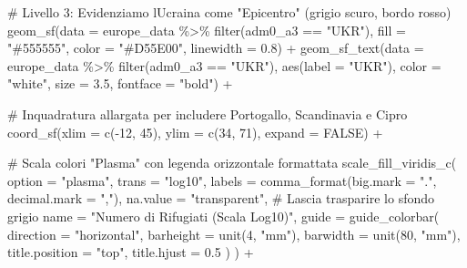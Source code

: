 \documentclass[
  letterpaper,
  DIV=11,
  numbers=noendperiod]{scrartcl}
\newenvironment{Shaded}{\begin{snugshade}}{\end{snugshade}}
\newcommand{\AttributeTok}[1]{\textcolor[rgb]{0.40,0.45,0.13}{#1}}
\newcommand{\CommentTok}[1]{\textcolor[rgb]{0.37,0.37,0.37}{#1}}
\newcommand{\ConstantTok}[1]{\textcolor[rgb]{0.56,0.35,0.01}{#1}}
\newcommand{\DecValTok}[1]{\textcolor[rgb]{0.68,0.00,0.00}{#1}}
\newcommand{\FloatTok}[1]{\textcolor[rgb]{0.68,0.00,0.00}{#1}}
\newcommand{\FunctionTok}[1]{\textcolor[rgb]{0.28,0.35,0.67}{#1}}
\newcommand{\NormalTok}[1]{\textcolor[rgb]{0.00,0.23,0.31}{#1}}
\newcommand{\SpecialCharTok}[1]{\textcolor[rgb]{0.37,0.37,0.37}{#1}}
\newcommand{\StringTok}[1]{\textcolor[rgb]{0.13,0.47,0.30}{#1}}
\begin{document}
\begin{Shaded}
\begin{Highlighting}[]
  \CommentTok{\# Livello 3: Evidenziamo l\textquotesingle{}Ucraina come "Epicentro" (grigio scuro, bordo rosso)}
  \FunctionTok{geom\_sf}\NormalTok{(}\AttributeTok{data =}\NormalTok{ europe\_data }\SpecialCharTok{\%\textgreater{}\%} \FunctionTok{filter}\NormalTok{(adm0\_a3 }\SpecialCharTok{==} \StringTok{"UKR"}\NormalTok{),}
          \AttributeTok{fill =} \StringTok{"\#555555"}\NormalTok{, }\AttributeTok{color =} \StringTok{"\#D55E00"}\NormalTok{, }\AttributeTok{linewidth =} \FloatTok{0.8}\NormalTok{) }\SpecialCharTok{+}
  \FunctionTok{geom\_sf\_text}\NormalTok{(}\AttributeTok{data =}\NormalTok{ europe\_data }\SpecialCharTok{\%\textgreater{}\%} \FunctionTok{filter}\NormalTok{(adm0\_a3 }\SpecialCharTok{==} \StringTok{"UKR"}\NormalTok{),}
               \FunctionTok{aes}\NormalTok{(}\AttributeTok{label =} \StringTok{"UKR"}\NormalTok{), }\AttributeTok{color =} \StringTok{"white"}\NormalTok{, }\AttributeTok{size =} \FloatTok{3.5}\NormalTok{, }\AttributeTok{fontface =} \StringTok{"bold"}\NormalTok{) }\SpecialCharTok{+}
  
  \CommentTok{\# Inquadratura allargata per includere Portogallo, Scandinavia e Cipro}
  \FunctionTok{coord\_sf}\NormalTok{(}\AttributeTok{xlim =} \FunctionTok{c}\NormalTok{(}\SpecialCharTok{{-}}\DecValTok{12}\NormalTok{, }\DecValTok{45}\NormalTok{), }\AttributeTok{ylim =} \FunctionTok{c}\NormalTok{(}\DecValTok{34}\NormalTok{, }\DecValTok{71}\NormalTok{), }\AttributeTok{expand =} \ConstantTok{FALSE}\NormalTok{) }\SpecialCharTok{+}
  
  \CommentTok{\# Scala colori "Plasma" con legenda orizzontale formattata}
  \FunctionTok{scale\_fill\_viridis\_c}\NormalTok{(}
    \AttributeTok{option =} \StringTok{"plasma"}\NormalTok{, }
    \AttributeTok{trans =} \StringTok{"log10"}\NormalTok{, }
    \AttributeTok{labels =} \FunctionTok{comma\_format}\NormalTok{(}\AttributeTok{big.mark =} \StringTok{"."}\NormalTok{, }\AttributeTok{decimal.mark =} \StringTok{","}\NormalTok{),}
    \AttributeTok{na.value =} \StringTok{"transparent"}\NormalTok{, }\CommentTok{\# Lascia trasparire lo sfondo grigio}
    \AttributeTok{name =} \StringTok{"Numero di Rifugiati (Scala Log10)"}\NormalTok{,}
    \AttributeTok{guide =} \FunctionTok{guide\_colorbar}\NormalTok{(}
      \AttributeTok{direction =} \StringTok{"horizontal"}\NormalTok{,}
      \AttributeTok{barheight =} \FunctionTok{unit}\NormalTok{(}\DecValTok{4}\NormalTok{, }\StringTok{"mm"}\NormalTok{),}
      \AttributeTok{barwidth =} \FunctionTok{unit}\NormalTok{(}\DecValTok{80}\NormalTok{, }\StringTok{"mm"}\NormalTok{),}
      \AttributeTok{title.position =} \StringTok{"top"}\NormalTok{,}
      \AttributeTok{title.hjust =} \FloatTok{0.5}
\NormalTok{    )}
\NormalTok{  ) }\SpecialCharTok{+}
  

\end{Highlighting}
\end{Shaded}
\end{document}

